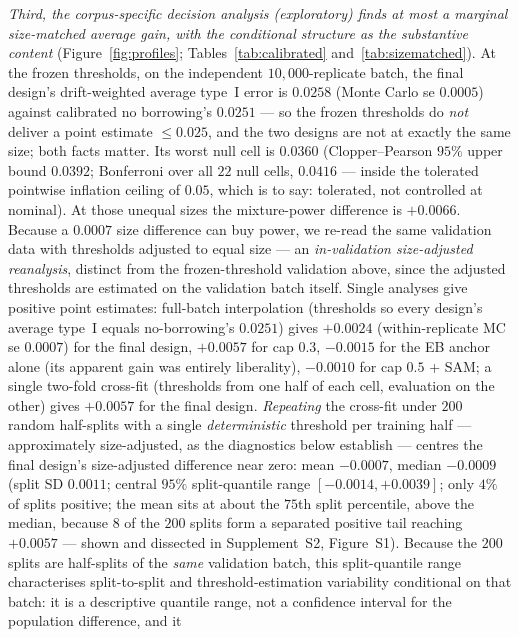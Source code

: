 \documentclass[11pt]{article}
\begin{document}
\emph{Third, the corpus-specific decision analysis (exploratory) finds at
most a marginal size-matched average gain, with the conditional structure
as the substantive content} (Figure~\ref{fig:profiles};
Tables~\ref{tab:calibrated} and~\ref{tab:sizematched}). At the frozen
thresholds, on the independent $10{,}000$-replicate batch, the final
design's drift-weighted average type~I error is $0.0258$ (Monte Carlo se
$0.0005$) against calibrated no borrowing's $0.0251$ --- so the frozen
thresholds do \emph{not} deliver a point estimate $\le 0.025$, and the two
designs are not at exactly the same size; both facts matter. Its worst
null cell is $0.0360$ (Clopper--Pearson $95\%$ upper bound $0.0392$;
Bonferroni over all $22$ null cells, $0.0416$ --- inside the tolerated
pointwise inflation ceiling of $0.05$, which is to say: tolerated, not
controlled at nominal). At those unequal sizes the mixture-power
difference is $+0.0066$. Because a $0.0007$ size difference can buy power,
we re-read the same validation data with thresholds adjusted to equal
size --- an \emph{in-validation size-adjusted reanalysis}, distinct from
the frozen-threshold validation above, since the adjusted thresholds are
estimated on the validation batch itself. Single analyses give positive
point estimates: full-batch interpolation (thresholds so every design's
average type~I equals no-borrowing's $0.0251$) gives $+0.0024$
(within-replicate MC se $0.0007$) for the final design, $+0.0057$ for cap
$0.3$, $-0.0015$ for the EB anchor alone (its apparent gain was entirely
liberality), $-0.0010$ for cap $0.5$ + SAM; a single two-fold cross-fit
(thresholds from one half of each cell, evaluation on the other) gives
$+0.0057$ for the final design. \emph{Repeating} the cross-fit under
$200$ random half-splits with a single \emph{deterministic} threshold
per training half --- approximately size-adjusted, as the diagnostics
below establish --- centres the final
design's size-adjusted difference near zero: mean $-0.0007$, median
$-0.0009$ (split SD $0.0011$; central $95\%$ split-quantile range
$[-0.0014, +0.0039]$; only $4\%$ of splits positive; the mean sits at
about the $75$th split percentile, above the median, because $8$ of the
$200$ splits form a separated positive tail reaching $+0.0057$ --- shown
and dissected in Supplement~S2, Figure~S1). Because the $200$
splits are half-splits of the \emph{same} validation batch, this
split-quantile range characterises split-to-split and
threshold-estimation
variability conditional on that batch: it is a descriptive quantile
range, not a confidence interval for the population difference, and it
\end{document}
